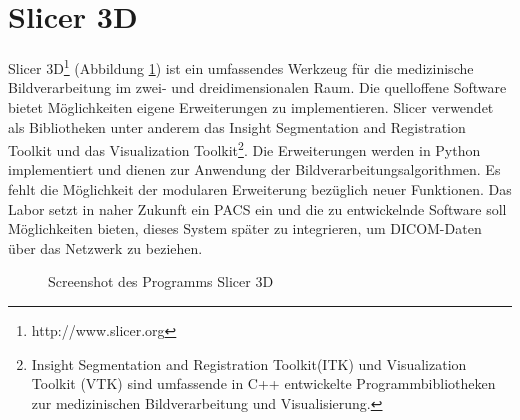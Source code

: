 \FloatBarrier
\section{Slicer 3D}

Slicer 3D\footnote{http://www.slicer.org} (Abbildung \ref{slicer3d}) ist ein umfassendes Werkzeug für die medizinische Bildverarbeitung im zwei- und dreidimensionalen Raum. Die quelloffene Software bietet Möglichkeiten eigene Erweiterungen zu implementieren. Slicer verwendet als Bibliotheken unter anderem das  Insight Segmentation and Registration Toolkit und das Visualization Toolkit\footnote{ Insight Segmentation and Registration Toolkit(ITK) und Visualization Toolkit (VTK) sind umfassende in C++ entwickelte Programmbibliotheken zur medizinischen Bildverarbeitung und Visualisierung.}. Die Erweiterungen werden in Python implementiert und dienen zur Anwendung der Bildverarbeitungsalgorithmen. Es fehlt die Möglichkeit der modularen Erweiterung bezüglich neuer Funktionen. Das Labor setzt in naher Zukunft ein PACS ein und die zu entwickelnde Software soll Möglichkeiten bieten, dieses System später zu integrieren, um DICOM-Daten über das Netzwerk zu beziehen.

\begin{figure}[htbp]
  \vspace{0.5cm}
  \centering
  \caption{Screenshot des Programms Slicer 3D \cite{slicer:screen}}
  \label{slicer3d}
  \vspace{0.5cm}
\end{figure}

